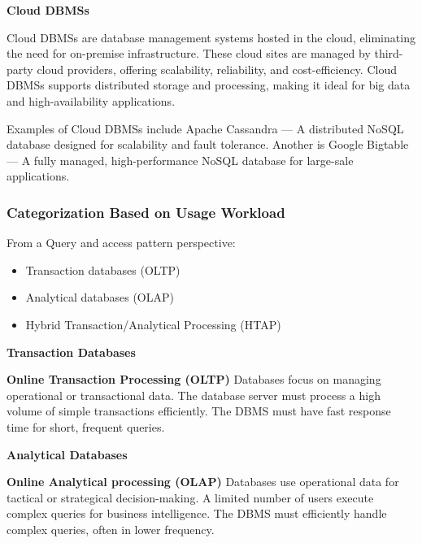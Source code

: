 \documentclass[11pt]{article}
\begin{document}
\vspace{11pt}
\textbf{Cloud DBMSs}
\vspace{11pt}

Cloud DBMSs are database management systems hosted in the cloud, eliminating the need for on-premise infrastructure. These cloud sites are managed by third-party cloud providers, offering scalability, reliability, and cost-efficiency. Cloud DBMSs supports distributed storage and processing, making it ideal for big data and high-availability applications.

Examples of Cloud DBMSs include Apache Cassandra --- A distributed NoSQL database designed for scalability and fault tolerance. Another is Google Bigtable --- A fully managed, high-performance NoSQL database for large-sale applications.

\vspace{11pt}
\subsubsection{Categorization Based on Usage Workload}
\vspace{11pt}

From a Query and access pattern perspective:
\begin{itemize}
    \item Transaction databases (OLTP)
    \item Analytical databases (OLAP)
    \item Hybrid Transaction/Analytical Processing (HTAP)
\end{itemize}

\vspace{11pt}
\textbf{Transaction Databases}
\vspace{11pt}

\textbf{Online Transaction Processing (OLTP)} Databases focus on managing operational or transactional data. The database server must process a high volume of simple transactions efficiently. The DBMS must have fast response time for short, frequent queries.

\vspace{11pt}
\textbf{Analytical Databases}
\vspace{11pt}

\textbf{Online Analytical processing (OLAP)} Databases use operational data for tactical or strategical decision-making. A limited number of users execute complex queries for business intelligence. The DBMS must efficiently handle complex queries, often in lower frequency.
\end{document}
